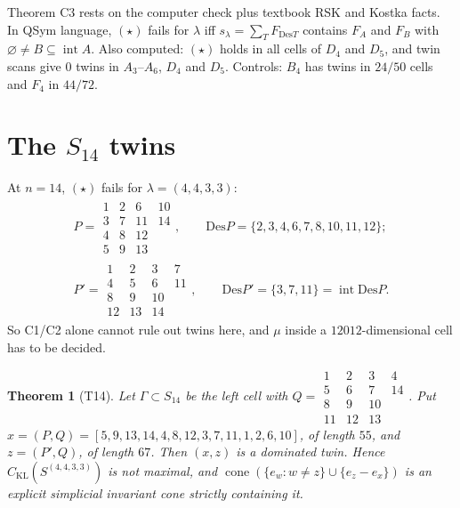 \documentclass[11pt]{amsart}
\newcommand{\gr}[1]{\textsf{#1}}
\newtheorem{theorem}{Theorem}[section]
\theoremstyle{definition}
\theoremstyle{remark}
\newcommand{\CKL}{C_{\mathrm{KL}}}
\newcommand{\Des}{\mathrm{Des}}
\newcommand{\intr}{\operatorname{int}}
\begin{document}
Theorem C3 rests on the computer check plus textbook RSK and Kostka facts. In QSym language, $(\star)$ fails for $\lambda$ iff $s_\lambda=\sum_T F_{\Des T}$ contains $F_A$ and $F_B$ with $\varnothing\ne B\subseteq\intr A$. Also \gr{computed}: $(\star)$ holds in all cells of $D_4$ and $D_5$, and twin scans give $0$ twins in $A_3$--$A_6$, $D_4$ and $D_5$. Controls: $B_4$ has twins in $24/50$ cells and $F_4$ in $44/72$.

\section{The \texorpdfstring{$S_{14}$}{S14} twins}

At $n=14$, $(\star)$ fails for $\lambda=(4,4,3,3)$:
\begin{gather*}
P=\begin{smallmatrix}1&2&6&10\\3&7&11&14\\4&8&12\\5&9&13\end{smallmatrix},\qquad \Des P=\{2,3,4,6,7,8,10,11,12\};\\
P'=\begin{smallmatrix}1&2&3&7\\4&5&6&11\\8&9&10\\12&13&14\end{smallmatrix},\qquad \Des P'=\{3,7,11\}=\intr\Des P.
\end{gather*}
So C1/C2 alone cannot rule out twins here, and $\mu$ inside a $12012$-dimensional cell has to be decided.

\begin{theorem}[T14]
Let $\Gamma\subset S_{14}$ be the left cell with $Q=\begin{smallmatrix}1&2&3&4\\5&6&7&14\\8&9&10\\11&12&13\end{smallmatrix}$. Put $x=(P,Q)=[5,9,13,14,4,8,12,3,7,11,1,2,6,10]$, of length $55$, and $z=(P',Q)$, of length $67$. Then $(x,z)$ is a dominated twin. Hence $\CKL(S^{(4,4,3,3)})$ is not maximal, and $\operatorname{cone}(\{e_w:w\ne z\}\cup\{e_z-e_x\})$ is an explicit simplicial invariant cone strictly containing it.
\end{theorem}
\end{document}
